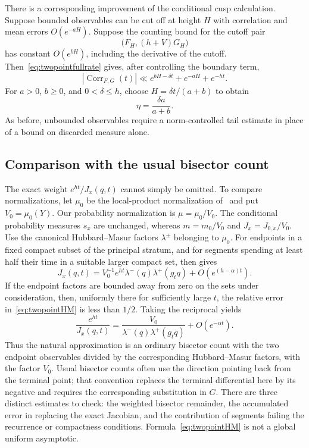 There is a corresponding improvement of the conditional cusp
calculation. Suppose bounded observables can be cut off at height
$H$ with correlation and mean errors $O(e^{-aH})$. Suppose the
counting bound for the cutoff pair
\[
 \bigl(F_H,(h+V)G_H\bigr)
\]
has constant $O(e^{bH})$, including the derivative of the cutoff.
Then~\eqref{eq:twopointfullrate} gives, after controlling the
boundary term,
\[
 |\operatorname{Corr}_{F,G}(t)|
   \ll e^{bH-\delta t}+e^{-aH}+e^{-ht}.
\]
For $a>0$, $b\geq0$, and $0<\delta\leq h$, choose
$H=\delta t/(a+b)$ to obtain
\begin{equation}
 \eta=\frac{\delta a}{a+b}.
 \label{eq:twopointfullcusprate}
\end{equation}
As before, unbounded observables require a norm-controlled tail
estimate in place of a bound on discarded measure alone.


\subsection{Comparison with the usual bisector count}
\label{subsec:twopointjacobian}

The exact weight $e^{ht}/J_x(q,t)$ cannot simply be omitted.
To compare normalizations, let $\mu_0$ be the local-product
normalization of~\cite[Section 2.2]{ABEMPolar} and put
$V_0=\mu_0(Y)$. Our probability normalization is
$\mu=\mu_0/V_0$. The conditional probability measures $s_x$ are
unchanged, whereas $m=m_0/V_0$ and $J_x=J_{0,x}/V_0$.
Use the canonical Hubbard--Masur factors $\lambda^\pm$ belonging
to $\mu_0$. For endpoints in a fixed compact subset of the principal
stratum, and for segments spending at least half their time in a
suitable larger compact set,
\cite[Proposition 2.5]{ABEMPolar} then gives
\begin{equation}
 J_x(q,t)
   =V_0^{-1}e^{ht}\lambda^-(q)\lambda^+(g_tq)
       +O(e^{(h-\alpha)t}).
 \label{eq:twopointHM}
\end{equation}
If the endpoint factors are bounded away from zero on the sets
under consideration, then, uniformly there for sufficiently large $t$,
the relative error in~\eqref{eq:twopointHM} is less than $1/2$.
Taking the reciprocal yields
\begin{equation}
 \frac{e^{ht}}{J_x(q,t)}
   =\frac{V_0}{\lambda^-(q)\lambda^+(g_tq)}
      +O(e^{-\alpha t}).
 \label{eq:twopointinverseHM}
\end{equation}
Thus the natural approximation is an ordinary bisector count with
the two endpoint observables divided by the corresponding
Hubbard--Masur factors, with the factor $V_0$. Usual bisector counts
often use the direction pointing back from the terminal point;
that convention replaces the terminal differential here by its
negative and requires the corresponding substitution in $G$.
There are three distinct estimates to check:
the weighted bisector remainder, the accumulated error in replacing
the exact Jacobian, and the contribution of segments failing the
recurrence or compactness conditions. Formula~\eqref{eq:twopointHM}
is not a global uniform asymptotic.

